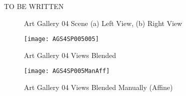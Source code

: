 %
%
%
%
%
%

%
%
%



TO BE WRITTEN

\begin{figure}[!h]
\label{ArtGallery4Images}
\centering
{}
\caption{Art Gallery 04 Scene (a) Left View, (b) Right View}
\end{figure}

\begin{figure}[!h]
\label{ArtGallery4Stitched}
\centering
\texttt{[image: AGS4SP005005]}
\caption{Art Gallery 04 Views Blended}
\end{figure}

\begin{figure}[!h]
\label{ArtGallery4StitchedManual}
\centering
\texttt{[image: AGS4SP005ManAff]}
\caption{Art Gallery 04 Views Blended Manually (Affine)}
\end{figure}




